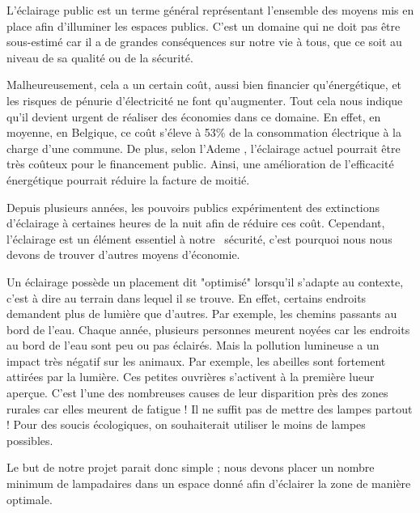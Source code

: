  
 
L'\'eclairage public est un terme g\'en\'eral repr\'esentant l'ensemble des moyens mis en place afin d'illuminer les espaces publics. C'est un domaine qui ne doit pas \^etre sous-estim\'e car il a de grandes cons\'equences sur notre vie \`a tous, que ce soit au niveau de sa qualit\'e ou de la s\'ecurit\'e. \cite{projwebsite}

 
 

Malheureusement, cela a un certain co\^ut, aussi bien financier qu'\'energ\'etique, et  les risques de p\'enurie d'\'electricit\'e ne font qu'augmenter. Tout cela nous indique qu'il devient urgent de r\'ealiser des \'economies dans ce domaine. En effet, en moyenne, en Belgique, ce co\^ut  s'\'eleve \`a 53\% de la consommation \'electrique \`a la charge d'une commune. De plus, selon l'Ademe \cite{ademe}, l'\'eclairage actuel pourrait \^etre tr\`es co\^uteux pour le financement public. Ainsi, une am\'elioration de l'efficacit\'e \'energ\'etique pourrait r\'eduire la facture de moiti\'e.




Depuis plusieurs ann\'ees, les pouvoirs publics exp\'erimentent des extinctions d'\'eclairage \`a certaines heures de la nuit afin de r\'eduire ces co\^ut. Cependant, l'\'eclairage est un \'el\'ement essentiel \`a notre \ s\'ecurit\'e, c'est pourquoi nous nous devons de trouver d'autres moyens d'\'economie.




Un \'eclairage poss\`ede un placement dit "optimis\'e" lorsqu'il s'adapte au contexte, c'est à dire au terrain dans lequel il se trouve. En effet, certains endroits demandent plus de lumi\`ere que d'autres. Par exemple, les chemins passants au bord de l'eau. Chaque ann\'ee, plusieurs personnes meurent noy\'ees car les endroits au bord de l'eau sont peu ou pas \'eclair\'es. Mais la pollution lumineuse a un impact tr\`es n\'egatif sur les animaux. Par exemple, les abeilles sont fortement attir\'ees par la lumi\`ere. Ces petites ouvri\`eres s'activent à la premi\`ere lueur aperçue. C'est l'une des nombreuses causes de leur disparition pr\`es des zones rurales car elles meurent de fatigue ! Il ne suffit pas de mettre des lampes partout ! Pour des soucis écologiques, on souhaiterait utiliser le moins de lampes possibles.




Le but de notre projet parait donc simple ; nous devons placer un nombre minimum de lampadaires dans un espace donné afin d'éclairer la zone de manière optimale.

